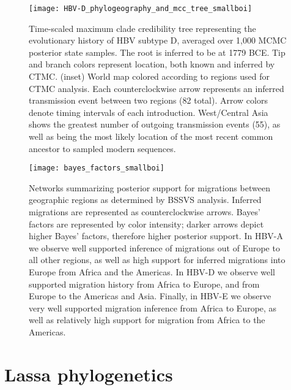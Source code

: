 \begin{figure}[ht]
  \centering
  \medskip
  \texttt{[image: HBV-D\_phylogeography\_and\_mcc\_tree\_smallboi]}
  \caption[HBV-D Phylogeography]{Time-scaled maximum clade credibility tree representing the evolutionary history of HBV subtype D, averaged over 1,000 MCMC posterior state samples. The root is inferred to be at 1779 BCE. Tip and branch colors represent location, both known and inferred by CTMC. (inset) World map colored according to regions used for CTMC analysis. Each counterclockwise arrow represents an inferred transmission event between two regions (82 total). Arrow colors denote timing intervals of each introduction. West/Central Asia shows the greatest number of outgoing transmission events (55), as well as being the most likely location of the most recent common ancestor to sampled modern sequences.}
  \label{fig:HBV-D_phylogeo}
\end{figure}

\begin{figure}[ht]
  \centering
  \medskip
  \texttt{[image: bayes\_factors\_smallboi]}
  \caption[Bayes' factors of HBV geographic transitions]{Networks summarizing posterior support for migrations between geographic regions as determined by BSSVS analysis. Inferred migrations are represented as counterclockwise arrows. Bayes' factors are represented by color intensity; darker arrows depict higher Bayes' factors, therefore higher posterior support. In HBV-A we observe well supported inference of migrations out of Europe to all other regions, as well as high support for inferred migrations into Europe from Africa and the Americas. In HBV-D we observe well supported migration history from Africa to Europe, and from Europe to the Americas and Asia. Finally, in HBV-E we observe very well supported migration inference from Africa to Europe, as well as relatively high support for migration from Africa to the Americas.}
  \label{fig:bayes_factors}
\end{figure}

\section{Lassa phylogenetics}





\cleardoublepage

